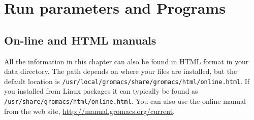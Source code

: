 %
%
%
%
%
%
%

\chapter{Run parameters and Programs}
\label{ch:programs}

\section{On-line and HTML manuals}
All the information in this chapter can also be found in HTML
format in your {\gromacs} data directory. The path depends on
where your files are installed, but the default location is
{\tt /usr/local/gromacs/share/gromacs/html/online.html}.
If you installed from Linux packages it can typically be found as
{\tt /usr/share/gromacs/html/online.html}.
You can also use the online manual from the {\gromacs} web site,
\url{http://manual.gromacs.org/current}.

